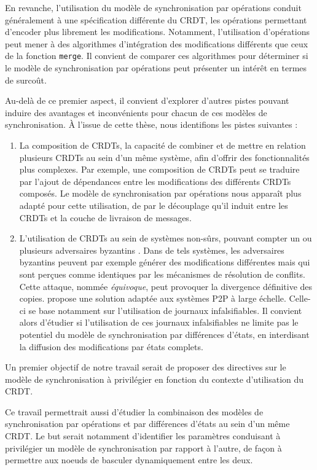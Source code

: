 En revanche, l'utilisation du modèle de synchronisation par opérations conduit généralement à une spécification différente du \ac{CRDT}, les opérations permettant d'encoder plus librement les modifications.
Notamment, l'utilisation d'opérations peut mener à des algorithmes d'intégration des modifications différents que ceux de la fonction \texttt{merge}.
Il convient de comparer ces algorithmes pour déterminer si le modèle de synchronisation par opérations peut présenter un intérêt en termes de surcoût.

Au-delà de ce premier aspect, il convient d'explorer d'autres pistes pouvant induire des avantages et inconvénients pour chacun de ces modèles de synchronisation.
À l'issue de cette thèse, nous identifions les pistes suivantes :
\begin{enumerate}
    \item La composition de \acp{CRDT}, \ie la capacité de combiner et de mettre en relation plusieurs \acp{CRDT} au sein d'un même système, afin d'offrir des fonctionnalités plus complexes.
        Par exemple, une composition de \acp{CRDT} peut se traduire par l'ajout de dépendances entre les modifications des différents \acp{CRDT} composés.
        Le modèle de synchronisation par opérations nous apparaît plus adapté pour cette utilisation, de par le découplage qu'il induit entre les \acp{CRDT} et la couche de livraison de messages.
    \item L'utilisation de \acp{CRDT} au sein de systèmes non-sûrs, \ie pouvant compter un ou plusieurs adversaires byzantins \cite{2019-byzantine-generals-problem-lamport}.
        Dans de tels systèmes, les adversaires byzantins peuvent par exemple générer des modifications différentes mais qui sont perçues comme identiques par les mécanismes de résolution de conflits.
        Cette attaque, nommée \emph{équivoque}, peut provoquer la divergence définitive des copies.
        \cite{2018-prunable-authenticated-log-vic} propose une solution adaptée aux systèmes \ac{P2P} à large échelle.
        Celle-ci se base notamment sur l'utilisation de journaux infalsifiables.
        Il convient alors d'étudier si l'utilisation de ces journaux infalsifiables ne limite pas le potentiel du modèle de synchronisation par différences d'états, \eg en interdisant la diffusion des modifications par états complets.
\end{enumerate}

Un premier objectif de notre travail serait de proposer des directives sur le modèle de synchronisation à privilégier en fonction du contexte d'utilisation du \ac{CRDT}.

Ce travail permettrait aussi d'étudier la combinaison des modèles de synchronisation par opérations et par différences d'états au sein d'un même \ac{CRDT}.
Le but serait notamment d'identifier les paramètres conduisant à privilégier un modèle de synchronisation par rapport à l'autre, de façon à permettre aux noeuds de basculer dynamiquement entre les deux.
